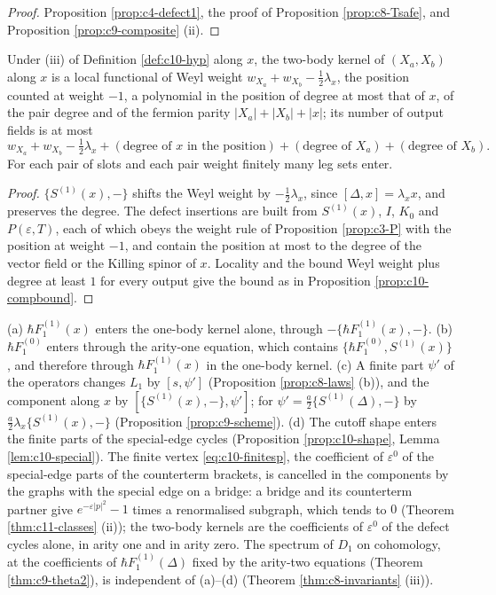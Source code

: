 \begin{proof}
Proposition \ref{prop:c4-defect1}, the proof of Proposition \ref{prop:c8-Tsafe}, and Proposition \ref{prop:c9-composite} (ii).
\end{proof}

\begin{proposition}
\label{prop:c10-bound1}
Under (iii) of Definition \ref{def:c10-hyp} along $x$, the two-body kernel of $(X_a,X_b)$ along $x$ is a local functional of Weyl weight $w_{X_a}+w_{X_b}-\tfrac12\lambda_x$, the position counted at weight $-1$, a polynomial in the position of degree at most that of $x$, of the pair degree and of the fermion parity $|X_a|+|X_b|+|x|$; its number of output fields is at most
\[
w_{X_a}+w_{X_b}-\tfrac12\lambda_x+(\text{degree of }x\text{ in the position})+(\text{degree of }X_a)+(\text{degree of }X_b).
\]
For each pair of slots and each pair weight finitely many leg sets enter.
\end{proposition}

\begin{proof}
$\{S^{(1)}(x),-\}$ shifts the Weyl weight by $-\tfrac12\lambda_x$, since $[\Delta,x]=\lambda_xx$, and preserves the degree. The defect insertions are built from $S^{(1)}(x)$, $I$, $K_0$ and $P(\varepsilon,T)$, each of which obeys the weight rule of Proposition \ref{prop:c3-P} with the position at weight $-1$, and contain the position at most to the degree of the vector field or the Killing spinor of $x$. Locality and the bound Weyl weight plus degree at least $1$ for every output give the bound as in Proposition \ref{prop:c10-compbound}.
\end{proof}

\begin{remark}
\label{rem:c10-scheme1}
(a) $\hbar F_1^{(1)}(x)$ enters the one-body kernel alone, through $-\{\hbar F_1^{(1)}(x),-\}$. (b) $\hbar F_1^{(0)}$ enters through the arity-one equation, which contains $\{\hbar F_1^{(0)},S^{(1)}(x)\}$, and therefore through $\hbar F_1^{(1)}(x)$ in the one-body kernel. (c) A finite part $\psi'$ of the operators changes $L_1$ by $[s,\psi']$ (Proposition \ref{prop:c8-laws} (b)), and the component along $x$ by $[\{S^{(1)}(x),-\},\psi']$; for $\psi'=\tfrac a2\{S^{(1)}(\Delta),-\}$ by $\tfrac a2\lambda_x\{S^{(1)}(x),-\}$ (Proposition \ref{prop:c9-scheme}). (d) The cutoff shape enters the finite parts of the special-edge cycles (Proposition \ref{prop:c10-shape}, Lemma \ref{lem:c10-special}). The finite vertex \eqref{eq:c10-finitesp}, the coefficient of $\varepsilon^0$ of the special-edge parts of the counterterm brackets, is cancelled in the components by the graphs with the special edge on a bridge: a bridge and its counterterm partner give $e^{-\varepsilon|p|^2}-1$ times a renormalised subgraph, which tends to $0$ (Theorem \ref{thm:c11-classes} (ii)); the two-body kernels are the coefficients of $\varepsilon^0$ of the defect cycles alone, in arity one and in arity zero. The spectrum of $D_1$ on cohomology, at the coefficients of $\hbar F_1^{(1)}(\Delta)$ fixed by the arity-two equations (Theorem \ref{thm:c9-theta2}), is independent of (a)--(d) (Theorem \ref{thm:c8-invariants} (iii)).
\end{remark}

